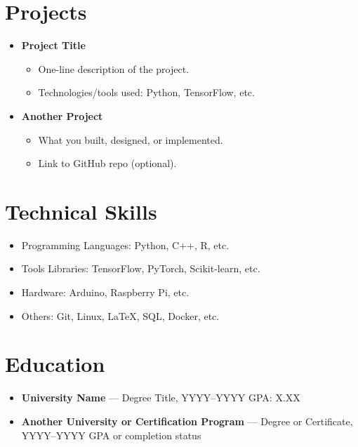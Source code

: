 \documentclass[a4paper,9pt]{article}
\begin{document}
\section*{Projects}
\begin{itemize}[leftmargin=0.15in]
    \item \textbf{Project Title}  
    \begin{itemize}
        \item One-line description of the project.
        \item Technologies/tools used: Python, TensorFlow, etc.
    \end{itemize}
    \item \textbf{Another Project}
    \begin{itemize}
        \item What you built, designed, or implemented.
        \item Link to GitHub repo (optional).
    \end{itemize}
\end{itemize}

\section*{Technical Skills}
\begin{itemize}[leftmargin=0.15in]
    \item Programming Languages: Python, C++, R, etc.
    \item Tools  Libraries: TensorFlow, PyTorch, Scikit-learn, etc.
    \item Hardware: Arduino, Raspberry Pi, etc.
    \item Others: Git, Linux, LaTeX, SQL, Docker, etc.
\end{itemize}

\section*{Education}
\begin{itemize}[leftmargin=0.15in]
    \item \textbf{University Name} — Degree Title, YYYY–YYYY  
    GPA: X.XX
    \item \textbf{Another University or Certification Program} — Degree or Certificate, YYYY–YYYY  
    GPA or completion status
\end{itemize}
\end{document}
